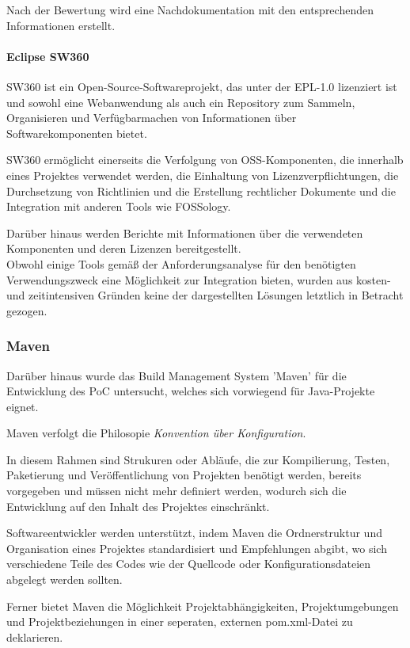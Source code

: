 Nach der Bewertung wird eine Nachdokumentation mit den entsprechenden Informationen erstellt. 

\paragraph{Eclipse SW360}

SW360 ist ein Open-Source-Softwareprojekt, das unter der EPL-1.0 lizenziert ist und sowohl eine Webanwendung als auch ein Repository zum Sammeln, Organisieren und Verfügbarmachen von Informationen über Softwarekomponenten bietet. \cite{} 

SW360 ermöglicht einerseits die Verfolgung von OSS-Komponenten, die innerhalb eines Projektes verwendet werden, die Einhaltung von Lizenzverpflichtungen, die Durchsetzung von Richtlinien und die Erstellung rechtlicher Dokumente und die Integration mit anderen Tools wie FOSSology. 

Darüber hinaus werden Berichte mit Informationen über die verwendeten Komponenten und deren Lizenzen bereitgestellt.\\

Obwohl einige Tools gemäß der Anforderungsanalyse für den benötigten Verwendungszweck eine Möglichkeit zur Integration bieten, wurden aus kosten- und zeitintensiven Gründen keine der dargestellten Lösungen letztlich in Betracht gezogen.   

\subsubsection{Maven}

Darüber hinaus wurde das Build Management System 'Maven' für die Entwicklung des PoC untersucht, welches sich vorwiegend für Java-Projekte eignet. 

Maven verfolgt die Philosopie \textit{Konvention über Konfiguration}. 

In diesem Rahmen sind Strukuren oder Abläufe, die zur Kompilierung, Testen, Paketierung und Veröffentlichung von Projekten benötigt werden, bereits vorgegeben und müssen nicht mehr definiert werden, wodurch sich die Entwicklung auf den Inhalt des Projektes einschränkt. \cite[]{}

Softwareentwickler werden unterstützt, indem Maven die Ordnerstruktur und Organisation eines Projektes standardisiert und Empfehlungen abgibt, wo sich verschiedene Teile des Codes wie der Quellcode oder Konfigurationsdateien abgelegt werden sollten. \cite[]{}  

Ferner bietet Maven die Möglichkeit Projektabhängigkeiten, Projektumgebungen und Projektbeziehungen in einer seperaten, externen pom.xml-Datei zu deklarieren. \cite[]{} 

